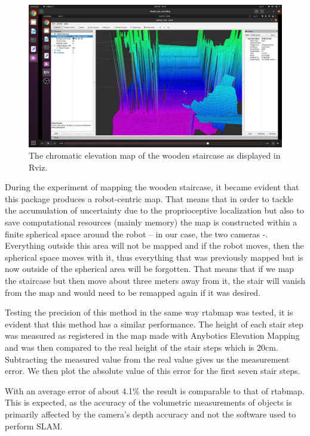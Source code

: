 \documentclass{article}
\begin{document}
\begin{figure}[h] %
    \centering
	\includegraphics[width=\textwidth,height=\textheight,keepaspectratio]{report1-img017.png} %
	\caption{The chromatic elevation map of the wooden staircase as displayed in Rviz. }
\end{figure}

During the experiment of mapping the wooden staircase, it became evident that this package produces a robot-centric map. That means that in order to tackle the accumulation of uncertainty due to the proprioceptive localization but also to save computational resources (mainly memory) the map is constructed within a finite spherical space around the robot – in our case, the two cameras -. Everything outside this area will not be mapped and if the robot moves, then the spherical space moves with it, thus everything that was previously mapped but is now outside of the spherical area will be forgotten. That means that if we map the staircase but then move about three meters away from it, the stair will vanish from the map and would need to be remapped again if it was desired.

Testing the precision of this method in the same way rtabmap was tested, it is evident that this method has a similar performance. The height of each stair step was measured as registered in the map made with Anybotics Elevation Mapping and was then compared to the real height of the stair steps which is 20cm. Subtracting the measured value from the real value gives us the measurement error. We then plot the absolute value of this error for the first seven stair steps.

With an average error of about 4.1\% the result is comparable to that of rtabmap. This is expected, as the accuracy of the volumetric measurements of objects is primarily affected by the camera's depth accuracy and not the software used to perform SLAM.
\end{document}

